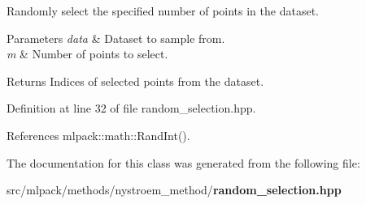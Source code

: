 Randomly select the specified number of points in the dataset. 


\begin{DoxyParams}{Parameters}
{\em data} & Dataset to sample from. \\
\hline
{\em m} & Number of points to select. \\
\hline
\end{DoxyParams}
\begin{DoxyReturn}{Returns}
Indices of selected points from the dataset. 
\end{DoxyReturn}


Definition at line 32 of file random\+\_\+selection.\+hpp.



References mlpack\+::math\+::\+Rand\+Int().



The documentation for this class was generated from the following file\+:\begin{DoxyCompactItemize}
\item 
src/mlpack/methods/nystroem\+\_\+method/{\bf random\+\_\+selection.\+hpp}\end{DoxyCompactItemize}
